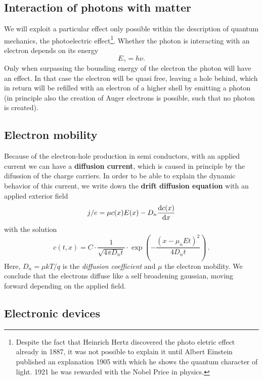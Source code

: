 \subsection{Interaction of photons with matter}
We will exploit a particular effect only possible within the description of quantum mechanics, the
photoelectric effect\footnote{Despite the fact that Heinrich Hertz discovered the 
photo eletric effect already in 1887, it was not possible to explain it until Albert Einstein
published an explanation 1905 with which he shows the quantum character
of light. 1921 he was rewarded with the Nobel Price in physics.}. 
Whether the photon is interacting with an electron depends on its energy
\begin{equation}
    E_\gamma = h \nu.
\end{equation}
Only when surpassing the bounding energy of the electron the photon will have an effect. In that
case the electron will be quasi free, leaving a hole behind, which in return will be refilled with
an electron of a higher shell by emitting a photon (in principle also the creation of Auger electrons is
possible, such that no photon is created). 
\subsection{Electron mobility}
Because of the electron-hole production in semi conductors, with an applied current we can have 
a \textbf{diffusion current}, which is caused in principle by the difussion of the charge carriers. In
order to be able to explain the dynamic behavior of this current, we write down the
\textbf{drift diffusion equation} with an applied exterior field
\begin{align}
    j/e =  \mu c(x) E(x) -  D_n \frac{\mathrm{d} c(x) }{\mathrm{d} x}  \\
\end{align}
with the solution
\begin{equation}
    c(t, x) = C \cdot \frac{1}{\sqrt{4 \pi D_n t}} 
    \cdot \exp\left( -\frac{\left( x - \mu_n E t \right)^2}{4 D_n t} \right) \, .
    \label{eq:c_t_x}
\end{equation}
Here,  $D_n = \mu kT /q$ is the \emph{diffusion coefficient} and $\mu$ the electron mobility.
We conclude that the electrons diffuse like a self broadening gaussian, moving forward depending on 
the applied field.

\subsection{Electronic devices}
